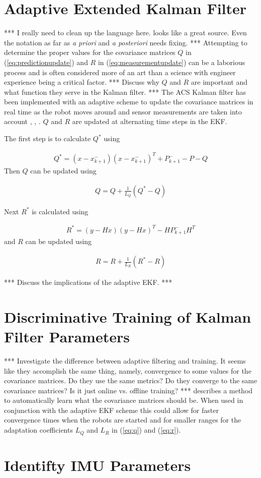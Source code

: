 \section{Adaptive Extended Kalman Filter}
*** I really need to clean up the language here. \cite{Busse03adaptiveEKF} looks like a great source. Even the notation as far as \textit{a priori} and \textit{a posteriori} needs fixing. *** Attempting to determine the proper values for the covariance matrices $Q$ in (\ref{eq:predictionupdate}) and $R$ in (\ref{eq:measurementupdate}) can be a laborious process and is often considered more of an art than a science with engineer experience being a critical factor. *** Discuss why $Q$ and $R$ are important and what function they serve in the Kalman filter. *** The ACS Kalman filter has been implemented with an adaptive scheme to update the covariance matrices in real time as the robot moves around and sensor measurements are taken into account \cite{Sights06}, \cite{Mehra72}, \cite{Busse03adaptiveEKF}. $Q$ and $R$ are updated at alternating time steps in the EKF.

The first step is to calculate $Q^\ast$ using

\begin{align}
\label{eq:qstar}
Q^\ast = \left(x-x_{k+1}^-\right)\left(x-x_{k+1}^-\right)^T + P_{k+1}^- - P - Q
\end{align}
Then $Q$ can be updated using

\begin{align}
\label{eq:q}
Q = Q + \frac{1}{L_Q}\left(Q^\ast-Q\right)
\end{align}

Next $R^\ast$ is calculated using

\begin{align}
\label{eq:rstar}
R^\ast = \left(y-Hx\right)\left(y-Hx\right)^T - HP_{k+1}^-H^T
\end{align}
and $R$ can be updated using

\begin{align}
\label{eq:r}
R = R + \frac{1}{L_R}\left(R^\ast-R\right)
\end{align}

*** Discuss the implications of the adaptive EKF. ***

\section{Discriminative Training of Kalman Filter Parameters}
*** Investigate the difference between adaptive filtering and training. It seems like they accomplish the same thing, namely, convergence to some values for the covariance matrices. Do they use the same metrics? Do they converge to the same covariance matrices? Is it just online vs. offline training? *** \cite{Abbeel-RSS-05} describes a method to automatically learn what the covariance matrices should be. When used in conjunction with the adaptive EKF scheme this could allow for faster convergence times when the robots are started and for smaller ranges for the adaptation coefficients $L_Q$ and $L_R$ in (\ref{eq:q}) and (\ref{eq:r}).

\section{Identifty IMU Parameters}